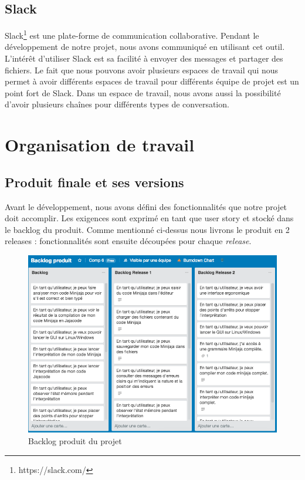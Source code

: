 \documentclass[a4paper,12pt]{article}
\begin{document}
\subsection{Slack}
Slack\footnote{https://slack.com/} est une plate-forme de communication collaborative. Pendant le développement de notre projet, nous avons communiqué en utilisant cet outil. L'intérêt d'utiliser Slack est sa facilité à envoyer des messages et partager des fichiers. Le fait que nous pouvons avoir plusieurs espaces de travail qui nous permet à avoir différents espaces de travail pour différents équipe de projet est un point fort de Slack. Dans un espace de travail, nous avons aussi la possibilité d'avoir plusieurs chaînes pour différents types de conversation.


\section{Organisation de travail}
\subsection{Produit finale et ses versions}
Avant le développement, nous avons défini des fonctionnalités que notre projet doit accomplir. Les exigences sont exprimé en tant que user story et stocké dans le backlog du produit.
Comme mentionné ci-dessus nous livrons le produit en 2 releases : fonctionnalités sont ensuite découpées pour chaque \textit{release}.

\begin{figure}[H]
\begin{center}
	\includegraphics[scale=0.3]{backlogproduit}
	\caption{Backlog produit du projet}
\end{center}
\end{figure}
\end{document}
